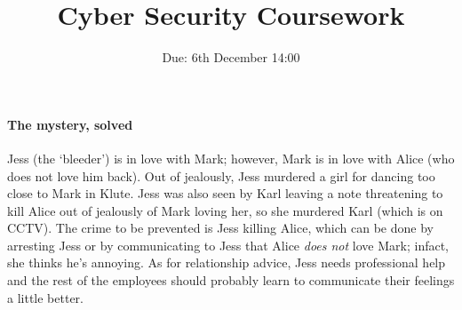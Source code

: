 \documentclass[a4paper]{article}
\title{Cyber Security Coursework}
\date{Due: 6th December 14:00}
\begin{document}
\maketitle

\paragraph{The mystery, solved}

Jess (the `bleeder') is in love with Mark; however, Mark is in love with Alice (who does not love him back). 
Out of jealously, Jess murdered a girl for dancing too close to Mark in Klute. 
Jess was also seen by Karl leaving a note threatening to kill Alice out of jealously of Mark loving her, so she murdered Karl (which is on CCTV).
The crime to be prevented is Jess killing Alice, which can be done by arresting Jess or by communicating to Jess that Alice \emph{does not} love Mark; infact, she thinks he's annoying.
As for relationship advice, Jess needs professional help and the rest of the employees should probably learn to communicate their feelings a little better.
\end{document}
